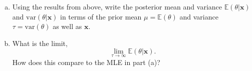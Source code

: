 \documentclass[11pt]{article}
\def\arr{\rightarrow}
\def\Exp{\mathbb{E}}
\def\var{\mbox{var}}
\newcommand{\xbf}{\mathbf{x}}
\begin{document}
\begin{enumerate}
\begin{enumerate}[(a)]
\item Using the results from above, write the posterior mean
 and variance $\Exp(\theta|\xbf)$ and $\var(\theta|\xbf)$ in
 terms of the prior mean 
 $\mu = \Exp(\theta)$ and variance $\tau = \var(\theta)$ 
 as well as $\xbf$.

\item What is the limit,
\[
    \lim_{\tau \arr \infty} \Exp(\theta|\xbf).
\]
How does this compare to the MLE in part (a)?

\end{enumerate}

\end{enumerate}
\end{document}
